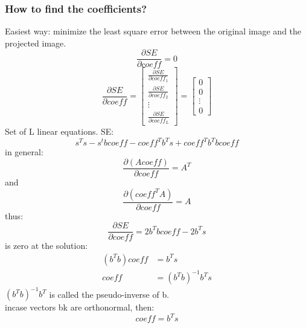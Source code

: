 \documentclass{article}
\begin{document}
\subsubsection{How to find the coefficients?}
Easiest way: minimize the least square error between the original image and the projected image. \\
\begin{equation}
    \frac{\partial SE}{\partial coeff} = 0
\end{equation}
\begin{equation}
    \frac{\partial SE}{\partial coeff} = \begin{bmatrix}
    \frac{\partial SE}{\partial coeff_1} \\
    \frac{\partial SE}{\partial coeff_2} \\
    \vdots \\
    \frac{\partial SE}{\partial coeff_L}
    \end{bmatrix} = \begin{bmatrix}
    0 \\
    0 \\
    \vdots \\
    0
    \end{bmatrix}
\end{equation}
Set of L linear equations.
SE:
\begin{equation}
    s^T s - s^t b coeff - coeff^T b^T s + coeff^T b^T b coeff
\end{equation}
in general:
\begin{equation}
    \frac{\partial (A coeff)}{\partial coeff} = A^T
\end{equation}
and 
\begin{equation}
    \frac{\partial (coeff^T A)}{\partial coeff} = A
\end{equation}
thus:
\begin{equation}
    \frac{\partial SE}{\partial coeff} = 2 b^T b coeff - 2 b^T s
\end{equation}
is zero at the solution:
\begin{equation}\begin{split}
    (b^T b) coeff &= b^T s \\
    coeff &= (b^T b)^{-1} b^T s
\end{split}\end{equation}
$(b^T b)^{-1} b^T$ is called the pseudo-inverse of b. \\
incase vectors bk are orthonormal, then:
\begin{equation}
    coeff = b^T s
\end{equation}
\pagebreak
\end{document}
